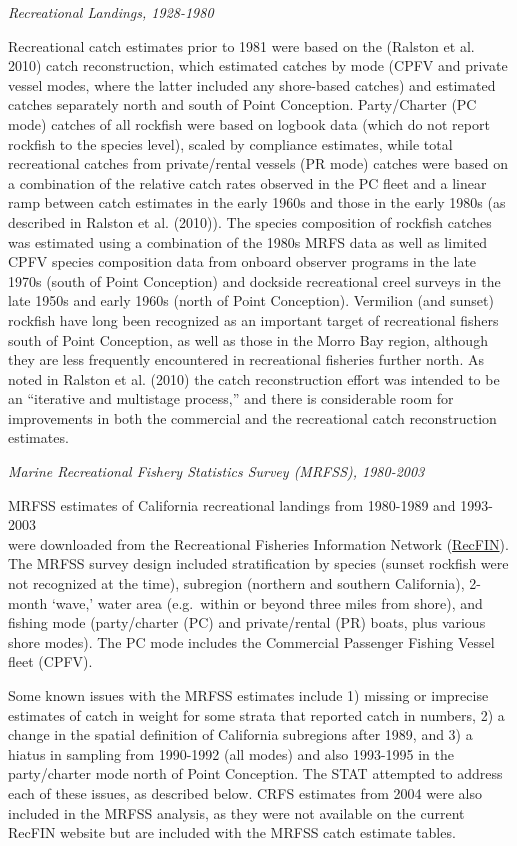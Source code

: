 \documentclass[
  english,
  a4paper,
]{article}
\begin{document}
\emph{Recreational Landings, 1928-1980}

Recreational catch estimates prior to 1981 were based on the (Ralston et al. 2010) catch reconstruction, which estimated catches by mode (CPFV and private vessel modes, where the latter included any shore-based catches) and estimated catches separately north and south of Point Conception. Party/Charter (PC mode) catches of all rockfish were based on logbook data (which do not report rockfish to the species level), scaled by compliance estimates, while total recreational catches from private/rental vessels (PR mode) catches were based on a combination of the relative catch rates observed in the PC fleet and a linear ramp between catch estimates in the early 1960s and those in the early 1980s (as described in Ralston et al. (2010)). The species composition of rockfish catches was estimated using a combination of the 1980s MRFS data as well as limited CPFV species composition data from onboard observer programs in the late 1970s (south of Point Conception) and dockside recreational creel surveys in the late 1950s and early 1960s (north of Point Conception). Vermilion (and sunset) rockfish have long been recognized as an important target of recreational fishers south of Point Conception, as well as those in the Morro Bay region, although they are less frequently encountered in recreational fisheries further north. As noted in Ralston et al. (2010) the catch reconstruction effort was intended to be an ``iterative and multistage process,'' and there is considerable room for improvements in both the commercial and the recreational catch reconstruction estimates.

\emph{Marine Recreational Fishery Statistics Survey (MRFSS), 1980-2003}

MRFSS estimates of California recreational landings from 1980-1989 and 1993-2003\\
were downloaded from the Recreational Fisheries Information Network
(\href{https://www.recfin.org/}{RecFIN}). The MRFSS survey design included stratification by
species (sunset rockfish were not recognized at the time), subregion (northern
and southern California), 2-month `wave,' water area (e.g.~within or beyond
three miles from shore), and fishing mode (party/charter (PC) and private/rental (PR) boats,
plus various shore modes). The PC mode includes the Commercial Passenger Fishing Vessel
fleet (CPFV).

Some known issues with the MRFSS estimates include 1) missing or imprecise estimates of catch
in weight for some strata that reported catch in numbers, 2) a change in the
spatial definition of California subregions after 1989, and 3) a hiatus in
sampling from 1990-1992 (all modes) and also 1993-1995 in the party/charter mode
north of Point Conception. The STAT attempted to address each of these issues,
as described below. CRFS estimates from 2004 were also included in the MRFSS
analysis, as they were not available on the current RecFIN website but are
included with the MRFSS catch estimate tables.
\end{document}
